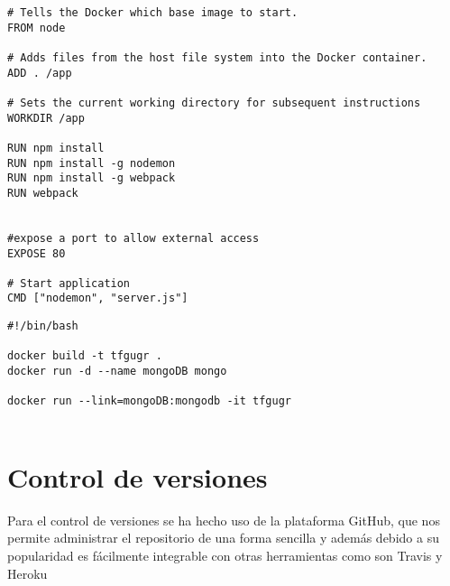 \begin{lstlisting}
# Tells the Docker which base image to start.
FROM node

# Adds files from the host file system into the Docker container.  
ADD . /app

# Sets the current working directory for subsequent instructions
WORKDIR /app

RUN npm install
RUN npm install -g nodemon
RUN npm install -g webpack
RUN webpack


#expose a port to allow external access
EXPOSE 80

# Start application
CMD ["nodemon", "server.js"] 
\end{lstlisting}

\begin{lstlisting}
#!/bin/bash

docker build -t tfgugr .
docker run -d --name mongoDB mongo

docker run --link=mongoDB:mongodb -it tfgugr


\end{lstlisting}


\section {Control de versiones}
Para el control de versiones se ha hecho uso de la plataforma GitHub, que nos permite administrar el repositorio de una forma sencilla y además debido a su popularidad es fácilmente integrable con otras herramientas como son Travis y Heroku










